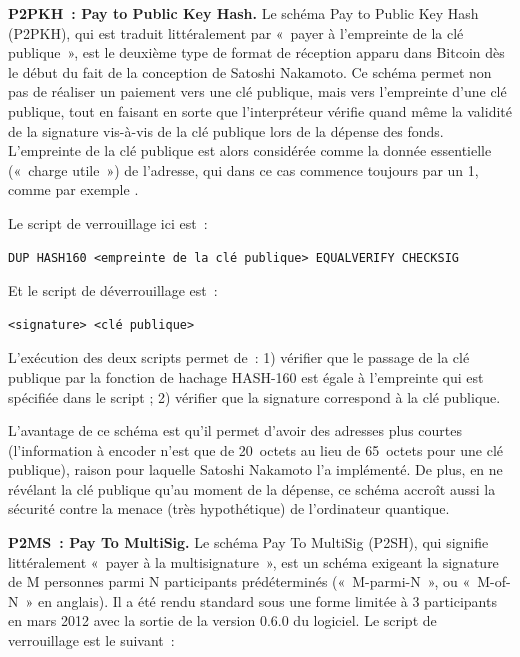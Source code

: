 
\textbf{P2PKH~: Pay to Public Key Hash.} Le schéma Pay to Public Key Hash (P2PKH), qui est traduit littéralement par «~payer à l'empreinte de la clé publique~», est le deuxième type de format de réception apparu dans Bitcoin dès le début du fait de la conception de Satoshi Nakamoto. Ce schéma permet non pas de réaliser un paiement vers une clé publique, mais vers l'empreinte d'une clé publique, tout en faisant en sorte que l'interpréteur vérifie quand même la validité de la signature vis-à-vis de la clé publique lors de la dépense des fonds. L'empreinte de la clé publique est alors considérée comme la donnée essentielle («~charge utile~») de l'adresse, qui dans ce cas commence toujours par un 1, comme par exemple .

Le script de verrouillage ici est~:

\begin{Verbatim}[fontsize=\footnotesize]
DUP HASH160 <empreinte de la clé publique> EQUALVERIFY CHECKSIG
\end{Verbatim}

Et le script de déverrouillage est~:

\begin{Verbatim}[fontsize=\footnotesize]
<signature> <clé publique>
\end{Verbatim}

L'exécution des deux scripts permet de~: 1) vérifier que le passage de la clé publique par la fonction de hachage HASH-160 est égale à l'empreinte qui est spécifiée dans le script ; 2) vérifier que la signature correspond à la clé publique.

L'avantage de ce schéma est qu'il permet d'avoir des adresses plus courtes (l'information à encoder n'est que de 20~octets au lieu de 65~octets pour une clé publique), raison pour laquelle Satoshi Nakamoto l'a implémenté. De plus, en ne révélant la clé publique qu'au moment de la dépense, ce schéma accroît aussi la sécurité contre la menace (très hypothétique) de l'ordinateur quantique.


\textbf{P2MS~: Pay To MultiSig.} Le schéma Pay To MultiSig (P2SH), qui signifie littéralement «~payer à la multisignature~», est un schéma exigeant la signature de M personnes parmi N participants prédéterminés («~M-parmi-N~», ou «~M-of-N~» en anglais). Il a été rendu standard sous une forme limitée à 3 participants en mars 2012 avec la sortie de la version 0.6.0 du logiciel. Le script de verrouillage est le suivant~:

